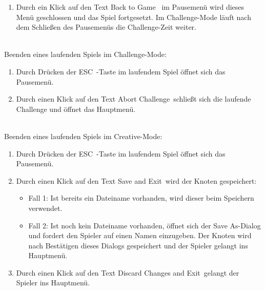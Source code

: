 \begin{description}
\begin{enumerate}
		\item Durch ein Klick auf den Text \glqq Back to Game\grqq~ im Pausemenü wird dieses Menü geschlossen und das Spiel fortgesetzt. Im Challenge-Mode läuft nach dem Schließen des Pausemenüs die Challenge-Zeit weiter.
		
	\end{enumerate}
	
\clearpage
	
	~\\Beenden eines laufenden Spiels im Challenge-Mode:

	\begin{enumerate} 
	
		\item Durch Drücken der \glqq ESC\grqq~-Taste im laufendem Spiel öffnet sich das Pausemenü.
		
		\item Durch einen Klick auf den Text  \glqq Abort Challenge\grqq~schließt sich die laufende Challenge und öffnet das Hauptmenü.
		
	\end{enumerate}
	
		~\\Beenden eines laufenden Spiels im Creative-Mode:

	\begin{enumerate} 
	
		\item Durch Drücken der \glqq ESC\grqq~-Taste im laufendem Spiel öffnet sich das Pausemenü.
		
		\item Durch einen Klick auf den Text \glqq Save and Exit\grqq~wird der Knoten gespeichert:
		
		\begin{itemize}
		
			\item Fall 1: Ist bereits ein Dateiname vorhanden, wird dieser beim Speichern verwendet.
			
			\item Fall 2: Ist noch kein Dateiname vorhanden, öffnet sich der \glqq Save As\grqq-Dialog und fordert den Spieler auf einen Namen einzugeben. Der Knoten wird nach Bestätigen dieses Dialogs gespeichert und der Spieler gelangt ins Hauptmenü.\\
		
		\end{itemize}
		
		
		\item Durch einen Klick auf den Text \glqq Discard Changes and Exit\grqq~gelangt der Spieler ins Hauptmenü.	
		~\\	
		

\end{enumerate}
\end{description}
